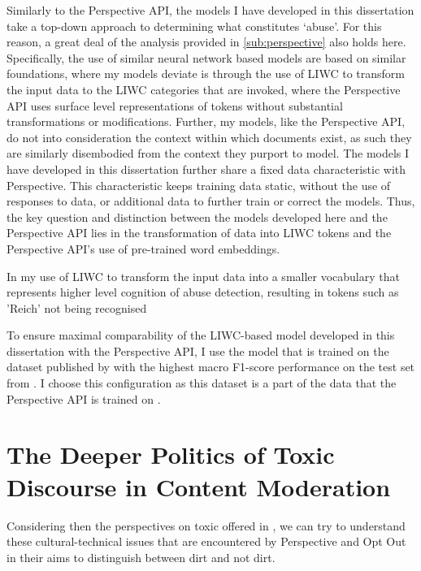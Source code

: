 Similarly to the Perspective API, the models I have developed in this dissertation take a top-down approach to determining what constitutes `abuse'. For this reason, a great deal of the analysis provided in \autoref{sub:perspective} also holds here. Specifically, the use of similar neural network based models are based on similar foundations, where my models deviate is through the use of LIWC \cite{Tausczik:2010} to transform the input data to the LIWC categories that are invoked, where the Perspective API uses surface level representations of tokens without substantial transformations or modifications. Further, my models, like the Perspective API, do not into consideration the context within which documents exist, as such they are similarly disembodied from the context they purport to model. The models I have developed in this dissertation further share a fixed data characteristic with Perspective. This characteristic keeps training data static, without the use of responses to data, or additional data to further train or correct the models. Thus, the key question and distinction between the models developed here and the Perspective API lies in the transformation of data into LIWC tokens and the Perspective API's use of pre-trained word embeddings.

In my use of LIWC to transform the input data into a smaller vocabulary that represents higher level cognition of abuse detection, resulting in tokens such as 'Reich' not being recognised

To ensure maximal comparability of the LIWC-based model developed in this dissertation with the Perspective API, I use the model that is trained on the dataset published by \citet{Wulczyn:2017} with the highest macro F1-score performance on the test set from \citet{Wulczyn:2017}. I choose this configuration as this dataset is a part of the data that the Perspective API is trained on \citep{Perspective:Github}.


\section{The Deeper Politics of Toxic Discourse in Content Moderation}

Considering then the perspectives on toxic offered in \cite{Risam:2015}, we can try to understand these cultural-technical issues that are encountered by Perspective and Opt Out in their aims to distinguish between dirt and not dirt.

